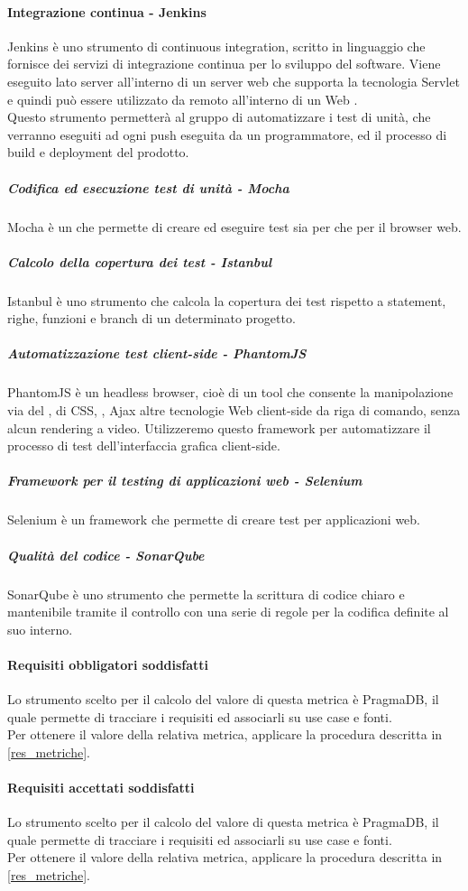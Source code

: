 \paragraph{Integrazione continua - Jenkins}
Jenkins è uno strumento  di continuous integration, scritto in linguaggio  che fornisce dei servizi di integrazione continua per lo sviluppo del software. Viene eseguito lato server all'interno di un server web che supporta la tecnologia Servlet e quindi può essere utilizzato da remoto all'interno di un Web .\\
Questo strumento permetterà al gruppo di automatizzare i test di unità, che verranno eseguiti ad ogni push eseguita da un programmatore, ed il processo di build e deployment del prodotto.
\subparagraph{Codifica ed esecuzione test di unità - Mocha}
Mocha è un  che permette di creare ed eseguire test sia per  che per il browser web.
\subparagraph{Calcolo della copertura dei test - Istanbul}
Istanbul è uno strumento che calcola la copertura dei test rispetto a statement, righe, funzioni e branch di un determinato progetto.
\subparagraph{Automatizzazione test client-side - PhantomJS}
PhantomJS è un headless browser, cioè di un tool che consente la manipolazione via  del , di CSS, , Ajax altre tecnologie Web client-side da riga di comando, senza alcun rendering a video. Utilizzeremo questo framework per automatizzare il processo di test dell'interfaccia grafica client-side.
\subparagraph{Framework per il testing di applicazioni web - Selenium}
Selenium è un framework che permette di creare test per applicazioni web.
\subparagraph{Qualità del codice - SonarQube}
SonarQube è uno strumento che permette la scrittura di codice chiaro e mantenibile tramite il controllo con una serie di regole per la codifica definite al suo interno.

\paragraph{Requisiti obbligatori soddisfatti}
Lo strumento scelto per il calcolo del valore di questa metrica è PragmaDB, il quale permette di tracciare i requisiti ed associarli su use case e fonti.\\
Per ottenere il valore della relativa metrica, applicare la procedura descritta in \ref{res_metriche}.
\paragraph{Requisiti accettati soddisfatti}
Lo strumento scelto per il calcolo del valore di questa metrica è PragmaDB, il quale permette di tracciare i requisiti ed associarli su use case e fonti.\\
Per ottenere il valore della relativa metrica, applicare la procedura descritta in \ref{res_metriche}.
